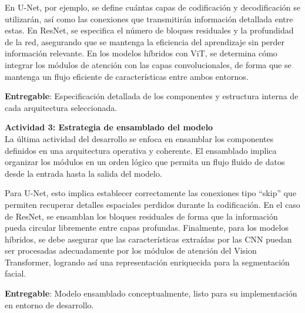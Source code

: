 En U-Net, por ejemplo, se define cuántas capas de codificación y decodificación se utilizarán, así como las conexiones que transmitirán información detallada entre estas. En ResNet, se especifica el número de bloques residuales y la profundidad de la red, asegurando que se mantenga la eficiencia del aprendizaje sin perder información relevante. En los modelos híbridos con ViT, se determina cómo integrar los módulos de atención con las capas convolucionales, de forma que se mantenga un flujo eficiente de características entre ambos entornos.

 \textbf{Entregable}: Especificación detallada de los componentes y estructura interna de cada arquitectura seleccionada.


 \textbf{Actividad 3: Estrategia de ensamblado del modelo}
 \\
 La última actividad del desarrollo se enfoca en ensamblar los componentes definidos en una arquitectura operativa y coherente. El ensamblado implica organizar los módulos en un orden lógico que permita un flujo fluido de datos desde la entrada hasta la salida del modelo.

Para U-Net, esto implica establecer correctamente las conexiones tipo “skip” que permiten recuperar detalles espaciales perdidos durante la codificación. En el caso de ResNet, se ensamblan los bloques residuales de forma que la información pueda circular libremente entre capas profundas. Finalmente, para los modelos híbridos, se debe asegurar que las características extraídas por las CNN puedan ser procesadas adecuadamente por los módulos de atención del Vision Transformer, logrando así una representación enriquecida para la segmentación facial.

 \textbf{Entregable}: Modelo ensamblado conceptualmente, listo para su implementación en entorno de desarrollo.

